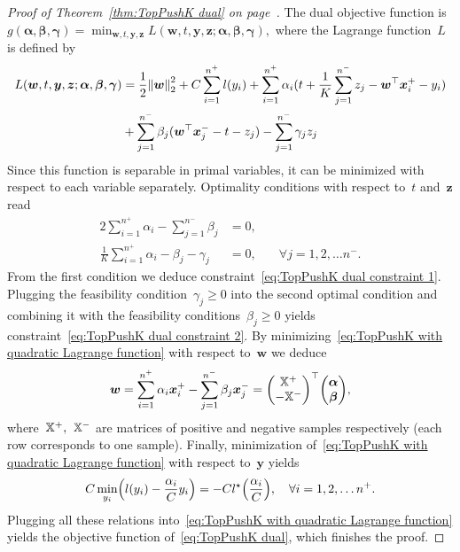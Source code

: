 \begin{proof}[Proof of Theorem~\ref{thm:TopPushK dual} on page~\pageref{thm:TopPushK dual}]
  The dual objective function is~$g(\bm{\alpha}, \bm{\beta}, \bm{\gamma}) = \min_{\bm{w}, t, \bm{y}, \bm{z}} L(\bm{w}, t, \bm{y}, \bm{z}; \bm{\alpha}, \bm{\beta}, \bm{\gamma}),$ where the Lagrange function~$L$ is defined by
  \begin{equation}\label{eq:TopPushK with quadratic Lagrange function}
    \begin{aligned}
      L(\bm{w}, t, \bm{y}, \bm{z}; \bm{\alpha}, \bm{\beta}, \bm{\gamma})
      & = \frac{1}{2} \norm{\bm{w}}_{2}^{2}
        + C \sum_{i = 1}^{n^+} l(y_i)
        + \sum_{i = 1}^{n^+} \alpha_i(t + \frac{1}{K} \sum_{j = 1}^{n^-} z_j - \bm{w}^\top\bm{x}^+_i - y_i) \\ 
      & + \sum_{j = 1}^{n^-} \beta_j (\bm{w}^{\top}\bm{x}^-_j - t - z_j)
        - \sum_{j = 1}^{n^-} \gamma_j z_j
    \end{aligned}
  \end{equation}
  Since this function is separable in primal variables, it can be minimized with respect to each variable separately. Optimality conditions with respect to~$t$ and~$\bm{z}$ read
  \begin{alignat*}{2}
    \sum_{i = 1}^{n^+} \alpha_i - \sum_{j = 1}^{n^-} \beta_j     & = 0, \\
    \frac{1}{K} \sum_{i = 1}^{n^+} \alpha_i - \beta_j - \gamma_j & = 0, & \quad \forall j = 1, 2, \ldots n^-.
  \end{alignat*}
  From the first condition we deduce constraint~\eqref{eq:TopPushK dual constraint 1}. Plugging the feasibility condition~$\gamma_j \geq 0$ into the second optimal condition and combining it with the feasibility conditions~$\beta_j \geq 0$ yields constraint~\eqref{eq:TopPushK dual constraint 2}. By minimizing~\eqref{eq:TopPushK with quadratic Lagrange function} with respect to~$\bm{w}$ we deduce
  \begin{equation*}
    \bm{w}
        = \sum_{i = 1}^{n^+} \alpha_i \bm{x}^+_i - \sum_{j = 1}^{n^-} \beta_j \bm{x}^-_j
        = \Matrix{\X^+ \\ - \X^-}^\top \Matrix{\bm{\alpha} \\ \bm{\beta}},
  \end{equation*}
  where~$\mathbb{X}^+,$~$\mathbb{X}^-$ are matrices of positive and negative samples respectively (each row corresponds to one sample). Finally, minimization of~\eqref{eq:TopPushK with quadratic Lagrange function} with respect to~$\bm{y}$ yields
  \begin{equation*}
    C \min_{y_i} \Brac{l(y_i) - \frac{\alpha_i}{C} y_i} = - C l^{\star} \Brac{\frac{\alpha_i}{C}}, \quad \forall i = 1, 2, \ldots n^+.
  \end{equation*}
  Plugging all these relations into~\eqref{eq:TopPushK with quadratic Lagrange function} yields the objective function of~\eqref{eq:TopPushK dual}, which finishes the proof.
\end{proof}

